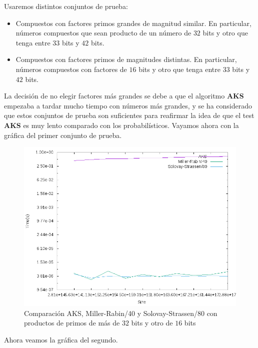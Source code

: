 Usaremos distintos conjuntos de prueba:

\begin{itemize}
	\item Compuestos con factores primos grandes de magnitud similar. En particular, números compuestos que sean producto de un número de $32$ bits y otro que tenga entre $33$ bits y $42$ bits.
	
	\item Compuestos con factores primos de magnitudes distintas. En particular, números compuestos con factores de $16$ bits y otro que tenga entre $33$ bits y $42$ bits.
\end{itemize}

La decisión de no elegir factores más grandes se debe a que el algoritmo \textbf{AKS} empezaba a tardar mucho tiempo con números más grandes, y se ha considerado que estos conjuntos de prueba son suficientes para reafirmar la idea de que el test \textbf{AKS} es muy lento comparado con los probabilísticos. Vayamos ahora con la gráfica del primer conjunto de prueba.

\begin{figure}[H]
	\centering
	\includegraphics[totalheight=12cm]{img/graphs/aks-probs-comps-16-mean}
	\caption{Comparación AKS, Miller-Rabin/40 y Solovay-Strassen/80 con productos de primos de más de $32$ bits y otro de $16$ bits}
\end{figure}

Ahora veamos la gráfica del segundo.

